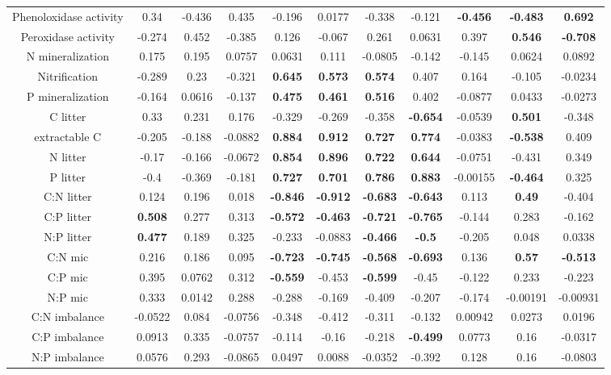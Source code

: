 \documentclass[10pt]{article}
\begin{document}
\begin{table}[h!]
\begin{center}
{\begin{tabular}{ccccccccccc}
  Phenoloxidase activity & 0.34 & -0.436 & 0.435 & -0.196 & 0.0177 & -0.338 & -0.121 & \textbf{ -0.456 } & \textbf{ -0.483 } & \textbf{ 0.692 } \\ 
  Peroxidase activity & -0.274 & 0.452 & -0.385 & 0.126 & -0.067 & 0.261 & 0.0631 & 0.397 & \textbf{ 0.546 } & \textbf{ -0.708 } \\ 
  N mineralization & 0.175 & 0.195 & 0.0757 & 0.0631 & 0.111 & -0.0805 & -0.142 & -0.145 & 0.0624 & 0.0892 \\ 
  Nitrification & -0.289 & 0.23 & -0.321 & \textbf{ 0.645 } & \textbf{ 0.573 } & \textbf{ 0.574 } & 0.407 & 0.164 & -0.105 & -0.0234 \\ 
  P mineralization & -0.164 & 0.0616 & -0.137 & \textbf{ 0.475 } & \textbf{ 0.461 } & \textbf{ 0.516 } & 0.402 & -0.0877 & 0.0433 & -0.0273 \\ 
  C litter & 0.33 & 0.231 & 0.176 & -0.329 & -0.269 & -0.358 & \textbf{ -0.654 } & -0.0539 & \textbf{ 0.501 } & -0.348 \\ 
  extractable C & -0.205 & -0.188 & -0.0882 & \textbf{ 0.884 } & \textbf{ 0.912 } & \textbf{ 0.727 } & \textbf{ 0.774 } & -0.0383 & \textbf{ -0.538 } & 0.409 \\ 
  N litter & -0.17 & -0.166 & -0.0672 & \textbf{ 0.854 } & \textbf{ 0.896 } & \textbf{ 0.722 } & \textbf{ 0.644 } & -0.0751 & -0.431 & 0.349 \\ 
  P litter & -0.4 & -0.369 & -0.181 & \textbf{ 0.727 } & \textbf{ 0.701 } & \textbf{ 0.786 } & \textbf{ 0.883 } & -0.00155 & \textbf{ -0.464 } & 0.325 \\ 
  C:N litter & 0.124 & 0.196 & 0.018 & \textbf{ -0.846 } & \textbf{ -0.912 } & \textbf{ -0.683 } & \textbf{ -0.643 } & 0.113 & \textbf{ 0.49 } & -0.404 \\ 
  C:P litter & \textbf{ 0.508 } & 0.277 & 0.313 & \textbf{ -0.572 } & \textbf{ -0.463 } & \textbf{ -0.721 } & \textbf{ -0.765 } & -0.144 & 0.283 & -0.162 \\ 
  N:P litter & \textbf{ 0.477 } & 0.189 & 0.325 & -0.233 & -0.0883 & \textbf{ -0.466 } & \textbf{ -0.5 } & -0.205 & 0.048 & 0.0338 \\ 
  C:N mic & 0.216 & 0.186 & 0.095 & \textbf{ -0.723 } & \textbf{ -0.745 } & \textbf{ -0.568 } & \textbf{ -0.693 } & 0.136 & \textbf{ 0.57 } & \textbf{ -0.513 } \\ 
  C:P mic & 0.395 & 0.0762 & 0.312 & \textbf{ -0.559 } & -0.453 & \textbf{ -0.599 } & -0.45 & -0.122 & 0.233 & -0.223 \\ 
  N:P mic & 0.333 & 0.0142 & 0.288 & -0.288 & -0.169 & -0.409 & -0.207 & -0.174 & -0.00191 & -0.00931 \\ 
  C:N imbalance & -0.0522 & 0.084 & -0.0756 & -0.348 & -0.412 & -0.311 & -0.132 & 0.00942 & 0.0273 & 0.0196 \\ 
  C:P imbalance & 0.0913 & 0.335 & -0.0757 & -0.114 & -0.16 & -0.218 & \textbf{ -0.499 } & 0.0773 & 0.16 & -0.0317 \\ 
  N:P imbalance & 0.0576 & 0.293 & -0.0865 & 0.0497 & 0.0088 & -0.0352 & -0.392 & 0.128 & 0.16 & -0.0803 \\ 
   \hline
\end{tabular}
}
\end{center}
\end{table}
\end{document}
